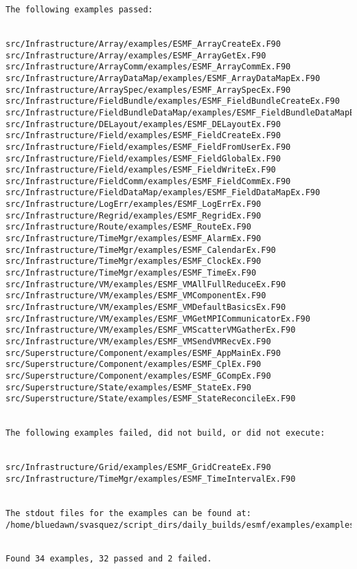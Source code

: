 \begin{verbatim}



The following examples passed:


src/Infrastructure/Array/examples/ESMF_ArrayCreateEx.F90
src/Infrastructure/Array/examples/ESMF_ArrayGetEx.F90
src/Infrastructure/ArrayComm/examples/ESMF_ArrayCommEx.F90
src/Infrastructure/ArrayDataMap/examples/ESMF_ArrayDataMapEx.F90
src/Infrastructure/ArraySpec/examples/ESMF_ArraySpecEx.F90
src/Infrastructure/FieldBundle/examples/ESMF_FieldBundleCreateEx.F90
src/Infrastructure/FieldBundleDataMap/examples/ESMF_FieldBundleDataMapEx.F90
src/Infrastructure/DELayout/examples/ESMF_DELayoutEx.F90
src/Infrastructure/Field/examples/ESMF_FieldCreateEx.F90
src/Infrastructure/Field/examples/ESMF_FieldFromUserEx.F90
src/Infrastructure/Field/examples/ESMF_FieldGlobalEx.F90
src/Infrastructure/Field/examples/ESMF_FieldWriteEx.F90
src/Infrastructure/FieldComm/examples/ESMF_FieldCommEx.F90
src/Infrastructure/FieldDataMap/examples/ESMF_FieldDataMapEx.F90
src/Infrastructure/LogErr/examples/ESMF_LogErrEx.F90
src/Infrastructure/Regrid/examples/ESMF_RegridEx.F90
src/Infrastructure/Route/examples/ESMF_RouteEx.F90
src/Infrastructure/TimeMgr/examples/ESMF_AlarmEx.F90
src/Infrastructure/TimeMgr/examples/ESMF_CalendarEx.F90
src/Infrastructure/TimeMgr/examples/ESMF_ClockEx.F90
src/Infrastructure/TimeMgr/examples/ESMF_TimeEx.F90
src/Infrastructure/VM/examples/ESMF_VMAllFullReduceEx.F90
src/Infrastructure/VM/examples/ESMF_VMComponentEx.F90
src/Infrastructure/VM/examples/ESMF_VMDefaultBasicsEx.F90
src/Infrastructure/VM/examples/ESMF_VMGetMPICommunicatorEx.F90
src/Infrastructure/VM/examples/ESMF_VMScatterVMGatherEx.F90
src/Infrastructure/VM/examples/ESMF_VMSendVMRecvEx.F90
src/Superstructure/Component/examples/ESMF_AppMainEx.F90
src/Superstructure/Component/examples/ESMF_CplEx.F90
src/Superstructure/Component/examples/ESMF_GCompEx.F90
src/Superstructure/State/examples/ESMF_StateEx.F90
src/Superstructure/State/examples/ESMF_StateReconcileEx.F90


The following examples failed, did not build, or did not execute:


src/Infrastructure/Grid/examples/ESMF_GridCreateEx.F90
src/Infrastructure/TimeMgr/examples/ESMF_TimeIntervalEx.F90


The stdout files for the examples can be found at:
/home/bluedawn/svasquez/script_dirs/daily_builds/esmf/examples/examplesO/AIX.default.64.default


Found 34 examples, 32 passed and 2 failed.


\end{verbatim}

